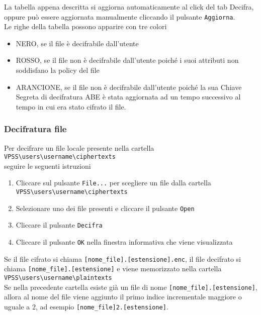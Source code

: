 \documentclass[a4paper,twoside,10pt,openany]{scrbook}
\begin{document}
La tabella appena descritta si aggiorna automaticamente al click del tab Decifra, oppure può essere aggiornata manualmente cliccando il pulsante \texttt{Aggiorna}.\\
Le righe della tabella possono apparire con tre colori
\begin{itemize}
 \item NERO, se il file è decifrabile dall'utente
 \item ROSSO, se il file non è decifrabile dall'utente poiché i suoi attributi non soddisfano la policy del file
 \item ARANCIONE, se il file non è decifrabile dall'utente poiché la sua Chiave Segreta di decifratura ABE è stata aggiornata ad un tempo successivo al tempo in cui era stato cifrato il file.
\end{itemize}
%
\subsubsection{Decifratura file}\label{sec:dec_localct}
%
Per decifrare un file locale presente nella cartella \\
\texttt{VPSS\textbackslash users\textbackslash username\textbackslash ciphertexts}\\
seguire le seguenti istruzioni
\begin{enumerate}
 \item Cliccare sul pulsante \texttt{File...} per scegliere un file dalla cartella\\
       \texttt{VPSS\textbackslash users\textbackslash username\textbackslash ciphertexts}
 \item Selezionare uno dei file presenti e cliccare il pulsante \texttt{Open}
 \item Cliccare il pulsante \texttt{Decifra}
 \item Cliccare il pulsante \texttt{OK} nella finestra informativa che viene visualizzata
\end{enumerate}
Se il file cifrato si chiama \texttt{[nome\_file].[estensione].enc}, il file decifrato si chiama \texttt{[nome\_file].[estensione]} e viene memorizzato nella cartella\\
\texttt{VPSS\textbackslash users\textbackslash username\textbackslash plaintexts}\\
Se nella precedente cartella esiste già un file di nome \texttt{[nome\_file].[estensione]}, allora al nome del file viene aggiunto il primo indice incrementale maggiore o uguale a 2, ad esempio \texttt{[nome\_file]2.[estensione]}.
%
\end{document}
